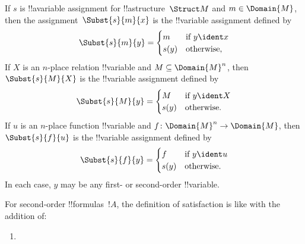 \documentclass[../../../include/open-logic-section]{subfiles}
\begin{document}
\begin{defn}
  If $s$ is !!a{variable} assignment for !!a{structure}~$\Struct M$
  and $m \in \Domain{M}$, then the assignment~$\Subst{s}{m}{x}$ is the
  !!{variable} assignment defined by
  \[\Subst{s}{m}{y} = \begin{cases}
    m & \text{if } y \ident x\\
    s(y) & \text{otherwise},
  \end{cases}\]
  If $X$ is an $n$-place relation !!{variable} and $M \subseteq
  \Domain{M}^n$, then $\Subst{s}{M}{X}$ is the !!{variable} assignment
  defined by
  \[\Subst{s}{M}{y} = \begin{cases}
    M & \text{if } y \ident X\\
    s(y) & \text{otherwise}. 
  \end{cases}\]
  If $u$ is an $n$-place function !!{variable} and $f\colon \Domain{M}^n
  \to \Domain{M}$, then $\Subst{s}{f}{u}$ is the !!{variable} assignment
  defined by
  \[\Subst{s}{f}{y} = \begin{cases}
    f & \text{if } y \ident u\\
    s(y) & \text{otherwise}.
  \end{cases}\]
  In each case, $y$ may be any first- or second-order !!{variable}.
\end{defn}

\begin{defn}[Satisfaction]
For second-order !!{formula}s~$!A$, the definition of satisfaction is
like  with the addition of:
\begin{enumerate}
\item {}



\end{enumerate}
\end{defn}
\end{document}
